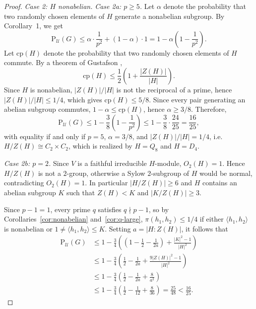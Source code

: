 \documentclass{amsart}
\newcommand{\Psu}{\mathrm{P}_{\mathcal{U}}}
\newcommand{\cp}{\mathrm{cp}}
\begin{document}
\begin{proof}
	\medskip
	\noindent\textit{Case 2: $H$ nonabelian.}	
		\medskip
		\noindent\textit{Case 2a: $p \geq 5$.}
			Let $\alpha$ denote the probability that two randomly chosen 
		elements of $H$ generate a nonabelian subgroup. By 
		Corollary~1, we get
		$$\mathrm{P}_{\mathcal{U}}(G) \leq \alpha \cdot \frac{1}{p^2} 
		+ (1-\alpha) \cdot 1 = 1 - \alpha\left(1-\frac{1}{p^2}\right).$$
	Let $\cp(H)$ denote the probability that two randomly chosen 
	elements of $H$ commute. By a theorem of Gustafson \cite{Gus73},
	$$\cp(H) \leq \frac{1}{2}\left(1 + \frac{|Z(H)|}{|H|}\right).$$
	Since $H$ is nonabelian, $|Z(H)|/|H|$ is not the reciprocal 
	of a prime, hence $|Z(H)|/|H| \leq 1/4$, which gives 
	$\cp(H) \leq 5/8$. Since every pair generating an abelian 
	subgroup commutes, $1 - \alpha \leq \cp(H)$, hence 
	$\alpha \geq 3/8$. Therefore,
	$$\Psu(G) \leq 1 - \frac{3}{8}\left(1-\frac{1}{p^2}\right) 
	\leq 1 - \frac{3}{8}\cdot\frac{24}{25} = \frac{16}{25},$$
	with equality if and only if $p=5$, $\alpha = 3/8$, and 
	$|Z(H)|/|H| = 1/4$, i.e.\ $H/Z(H) \cong C_2 \times C_2$, 
	which is realized by $H = Q_8$ and $H = D_4$.
		
		\medskip
		
		
		
		
		
		\noindent\textit{Case 2b: $p = 2$.}
	Since $V$ is a faithful irreducible $H$-module, $O_2(H)=1.$
	Hence $H/Z(H)$ is not a $2$-group, otherwise a Sylow 
	$2$-subgroup of $H$ would be normal, contradicting $O_2(H)=1$. 
	In particular $|H/Z(H)| \geq 6$ and $H$ contains an abelian subgroup 
	$K$ such that $Z(H) < K$ and $|K/Z(H)| \geq 3$.
	
	Since $p-1=1$, every prime $q$ satisfies $q \nmid p-1$, so 
	by Corollaries~\ref{cor:nonabelian} and~\ref{cor:q-large}, 
	$\pi(h_1,h_2) \leq 1/4$ if either $\langle h_1,h_2\rangle$ 
	is nonabelian or $1 \neq \langle h_1,h_2\rangle \leq K$.
	Setting $a = |H:Z(H)|$, it follows that
	\begin{align*}
		\Psu(G) &\leq 1-\frac{3}{4}\left(\left(1-\frac{1}{2}
		-\frac{1}{2a}\right)+\frac{|K|^2-1}{|H|^2}\right)\\
		&\leq 1-\frac{3}{4}\left(\frac{1}{2}-\frac{1}{2a}+
		\frac{9|Z(H)|^2-1}{|H|^2}\right)\\
		&\leq 1-\frac{3}{4}\left(\frac{1}{2}-\frac{1}{2a}+
		\frac{8}{a^2}\right)\\
		&\leq 1-\frac{3}{4}\left(\frac{1}{2}-\frac{1}{12}+
		\frac{8}{36}\right) = \frac{25}{48} < \frac{16}{25}.
	\end{align*}
	

\end{proof}
\end{document}
